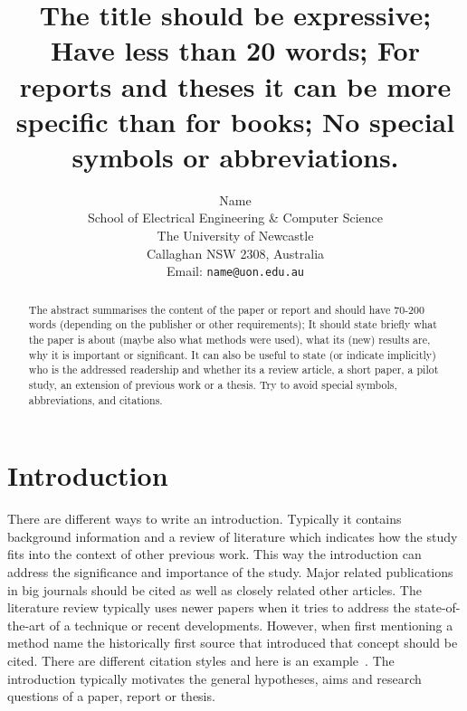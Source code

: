 \documentclass[a4,12pt]{article}
\begin{document}
%
\title{\bf The title should be expressive;  Have less than 20 words; For reports and theses it  can be more specific than for books; No special symbols or abbreviations. }
%
\author{Name\\
School of Electrical Engineering \& Computer Science\\
The University of Newcastle\\ Callaghan NSW 2308, Australia\\
Email: \texttt{name@uon.edu.au} } 

\maketitle


\newpage
\begin{abstract}%
\noindent The abstract summarises the content of the paper or report and should have 70-200 words (depending on the publisher or other requirements); It
should state briefly what the paper is about (maybe also what
methods were used), what its (new) results are, why it is
important or significant. It can also be useful to state (or
indicate implicitly) who is the addressed readership and whether
its a review article, a short paper, a pilot study, an
extension of previous work or a thesis. Try to avoid special symbols, abbreviations, and citations.
\end{abstract}

\pagebreak

\tableofcontents

\pagebreak

\section{Introduction}

There are different ways to write an introduction. Typically it
contains background information and a review of literature which
indicates how the study fits into the context of other previous
work. This way the introduction can  address the significance and importance of the study. Major related publications in big journals should be cited
as well as closely related other articles. The literature review typically uses newer papers when it tries to address the state-of-the-art of a technique or recent developments. However, when first mentioning a method name the historically first source that introduced that concept should be cited. There are different citation styles and here is an example~\citep{QuinlanChalupMiddletonACRA2003}. The introduction
typically motivates the general hypotheses, aims and research questions
of a paper, report or thesis.  
\end{document}
